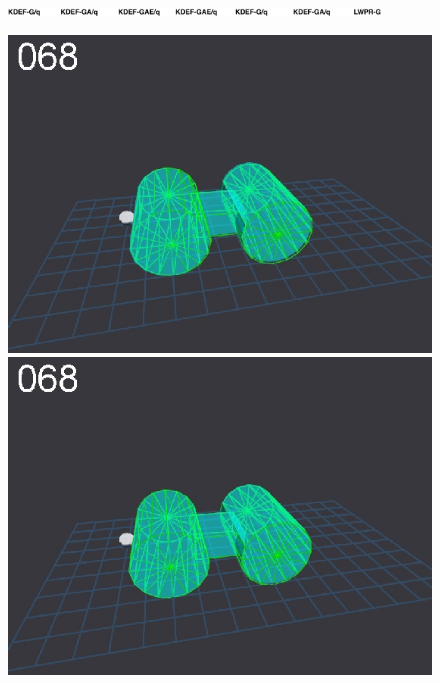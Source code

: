\begin{figure}[t]
\centerline{
\includegraphics[width=0.88\textwidth]{./fig17-conditions}
}
\centerline{
\includegraphics[width=\imgCXwid]{./C5_1exp_6_1}
\includegraphics[width=\imgCXwid]{./C5_2exp_6_1}
}
\end{figure}

